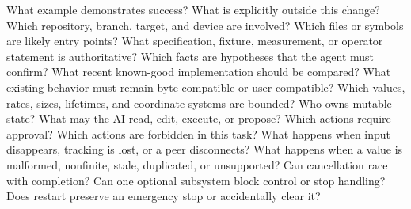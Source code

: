 \markdownRendererUlItem What example demonstrates success?\markdownRendererUlItemEnd 
\markdownRendererUlItem What is explicitly outside this change?\markdownRendererUlItemEnd 
\markdownRendererUlEnd \markdownRendererInterblockSeparator
{}
\markdownRendererSectionEnd \markdownRendererSectionBegin
{}\markdownRendererInterblockSeparator
{}\markdownRendererUlBegin
\markdownRendererUlItem Which repository, branch, target, and device are involved?\markdownRendererUlItemEnd 
\markdownRendererUlItem Which files or symbols are likely entry points?\markdownRendererUlItemEnd 
\markdownRendererUlItem What specification, fixture, measurement, or operator statement is authoritative?\markdownRendererUlItemEnd 
\markdownRendererUlItem Which facts are hypotheses that the agent must confirm?\markdownRendererUlItemEnd 
\markdownRendererUlItem What recent known-good implementation should be compared?\markdownRendererUlItemEnd 
\markdownRendererUlEnd \markdownRendererInterblockSeparator
{}
\markdownRendererSectionEnd \markdownRendererSectionBegin
{}\markdownRendererInterblockSeparator
{}\markdownRendererUlBegin
\markdownRendererUlItem What existing behavior must remain byte-compatible or user-compatible?\markdownRendererUlItemEnd 
\markdownRendererUlItem Which values, rates, sizes, lifetimes, and coordinate systems are bounded?\markdownRendererUlItemEnd 
\markdownRendererUlItem Who owns mutable state?\markdownRendererUlItemEnd 
\markdownRendererUlItem What may the AI read, edit, execute, or propose?\markdownRendererUlItemEnd 
\markdownRendererUlItem Which actions require approval?\markdownRendererUlItemEnd 
\markdownRendererUlItem Which actions are forbidden in this task?\markdownRendererUlItemEnd 
\markdownRendererUlEnd \markdownRendererInterblockSeparator
{}
\markdownRendererSectionEnd \markdownRendererSectionBegin
{}\markdownRendererInterblockSeparator
{}\markdownRendererUlBegin
\markdownRendererUlItem What happens when input disappears, tracking is lost, or a peer disconnects?\markdownRendererUlItemEnd 
\markdownRendererUlItem What happens when a value is malformed, nonfinite, stale, duplicated, or unsupported?\markdownRendererUlItemEnd 
\markdownRendererUlItem Can cancellation race with completion?\markdownRendererUlItemEnd 
\markdownRendererUlItem Can one optional subsystem block control or stop handling?\markdownRendererUlItemEnd 
\markdownRendererUlItem Does restart preserve an emergency stop or accidentally clear it?\markdownRendererUlItemEnd 
